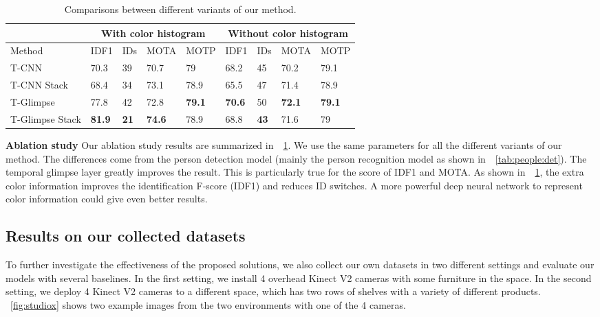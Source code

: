 \documentclass{article}
\begin{document}
\begin{table}
	\begin{center}
		\caption{Comparisons between different variants of our method. }
		\label{tab:tracking:wlablation}
		\begin{tabular}{l|p{0.4cm}p{0.4cm}p{0.7cm}p{0.8cm}|p{0.4cm}p{0.4cm}p{0.7cm}p{0.8cm}}
			\hline
			&\multicolumn{4}{c}{With color histogram} & \multicolumn{4}{|c}{Without color histogram} \\ \hline
Method	&	IDF1	&	IDs	&	MOTA	&	MOTP&	IDF1	&	IDs	&	MOTA	&	MOTP	\\ \hline
T-CNN	&	70.3	&	39	&	70.7	&	79&	68.2	&	45	&	70.2	&	79.1	\\
T-CNN Stack	&	68.4	&	34	&	73.1	&	78.9&	65.5	&	47	&	71.4	&	78.9	\\
T-Glimpse	&	77.8	&	42	&	72.8	&	\textbf{79.1}&	\textbf{70.6}	&	50	&	\textbf{72.1}	&	\textbf{79.1}	\\
T-Glimpse Stack	&	\textbf{81.9}	&	\textbf{21}	&	\textbf{74.6}	&	78.9&	68.8	&	\textbf{43}	&	71.6	&	79	\\ \hline
		\end{tabular}
	\end{center}
	
\end{table}

\textbf{Ablation study} Our ablation study results are summarized in~\tablename~{\ref{tab:tracking:wlablation}}. 
We use the same parameters for all the different variants of our method. 
The differences come from
the person detection model (mainly the person recognition model as shown in~\tablename{~\ref{tab:people:det}}). The temporal glimpse layer greatly improves the result. This is particularly true for the score of IDF1 and MOTA.  As shown in~\tablename~{\ref{tab:tracking:wlablation}}, 
the extra color information improves the identification F-score (IDF1) and reduces ID switches.
A more powerful deep neural network to represent color information could give even better results.


\subsection{Results on our collected datasets}
To further investigate the effectiveness of the proposed solutions, we also collect our own datasets in two different settings and evaluate our models with several baselines.
In the first setting, we install 4 overhead Kinect V2 cameras with some furniture in the space. In
the second setting, we deploy 4 Kinect V2 cameras to a different space, which has two rows of shelves with a variety of different products.
\figurename{~\ref{fig:studiox}} shows two example images from the two environments with one of the 4 cameras.
\end{document}
